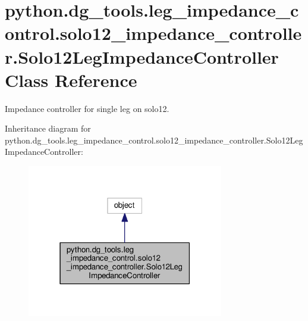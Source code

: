 \hypertarget{classpython_1_1dg__tools_1_1leg__impedance__control_1_1solo12__impedance__controller_1_1Solo12LegImpedanceController}{}\section{python.\+dg\+\_\+tools.\+leg\+\_\+impedance\+\_\+control.\+solo12\+\_\+impedance\+\_\+controller.\+Solo12\+Leg\+Impedance\+Controller Class Reference}
\label{classpython_1_1dg__tools_1_1leg__impedance__control_1_1solo12__impedance__controller_1_1Solo12LegImpedanceController}


Impedance controller for single leg on solo12.  




Inheritance diagram for python.\+dg\+\_\+tools.\+leg\+\_\+impedance\+\_\+control.\+solo12\+\_\+impedance\+\_\+controller.\+Solo12\+Leg\+Impedance\+Controller\+:
\nopagebreak
\begin{figure}[H]
\begin{center}
\leavevmode
\includegraphics[width=243pt]{classpython_1_1dg__tools_1_1leg__impedance__control_1_1solo12__impedance__controller_1_1Solo12Lef11bf14cfea20afec925052017bf9b7f}
\end{center}
\end{figure}


